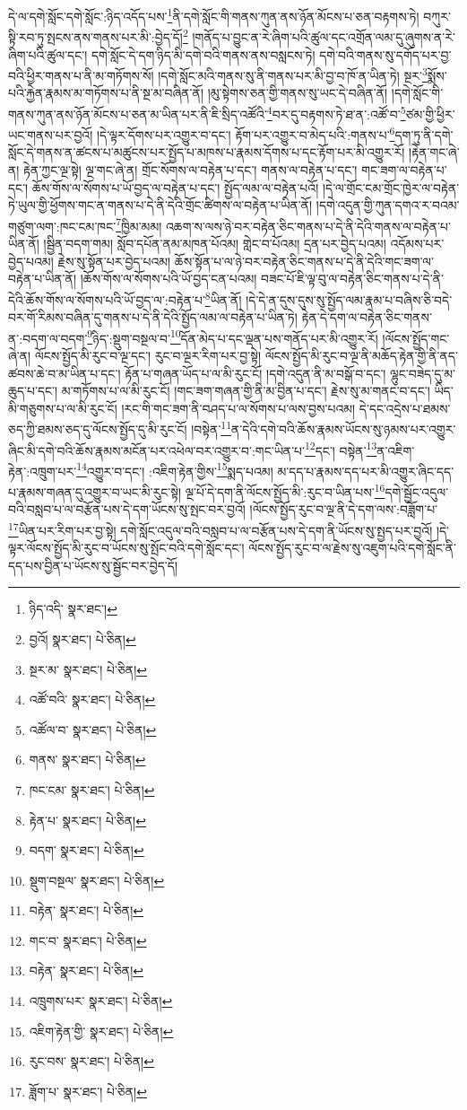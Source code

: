 དེ་ལ་དགེ་སློང་དགེ་སློང་:ཉིད་འདོད་པས་\footnote{ཉིད་འདི་  སྣར་ཐང་། }ནི་དགེ་སློང་གི་གནས་ཀུན་ནས་ཉོན་མོངས་པ་ཅན་བརྟགས་ཏེ། བཀུར་སྟི་རབ་ཏུ་སྤངས་ནས་གནས་པར་མི་:བྱེད་དོ།\footnote{བྱའོ།  སྣར་ཐང་།  པེ་ཅིན། } །གནོད་པ་བྱུང་ན་རེ་ཞིག་པའི་ཚུལ་དང་འགྲོན་ལམ་དུ་ཞུགས་ན་རེ་ཞིག་པའི་ཚུལ་དང་། དགེ་སློང་དེ་དག་ཉིད་མི་དགེ་བའི་གནས་ནས་བསླངས་ཏེ། དགེ་བའི་གནས་སུ་དགོད་པར་བྱ་བའི་ཕྱིར་གནས་པ་ནི་མ་གཏོགས་སོ། །དགེ་སློང་མའི་གནས་སུ་ནི་གནས་པར་མི་བྱ་བ་ཁོ་ན་ཡིན་ཏེ། སྔར་\footnote{སྔར་མ་  སྣར་ཐང་།  པེ་ཅིན། }སྨོས་པའི་རྐྱེན་རྣམས་མ་གཏོགས་པ་ནི་སྔ་མ་བཞིན་ནོ། །མུ་སྟེགས་ཅན་གྱི་གནས་སུ་ཡང་དེ་བཞིན་ནོ། །དགེ་སློང་གི་གནས་ཀུན་ནས་ཉོན་མོངས་པ་ཅན་མ་ཡིན་པར་ནི་ཇི་སྲིད་འཚོའི་\footnote{འཚོ་བའི་  སྣར་ཐང་།  པེ་ཅིན། }བར་དུ་བརྟགས་ཏེ་ཐ་ན་:འཚོ་བ་\footnote{འཚོལ་བ་  སྣར་ཐང་།  པེ་ཅིན། }ཙམ་གྱི་ཕྱིར་ཡང་གནས་པར་བྱའོ། །དེ་ལྟར་དོགས་པར་འགྱུར་བ་དང་། རྟོག་པར་འགྱུར་བ་མེད་པའི་:གནས་པ་\footnote{གནས་  སྣར་ཐང་།  པེ་ཅིན། }དག་ཏུ་ནི་དགེ་སློང་དེ་གནས་ན་ཚངས་པ་མཚུངས་པར་སྤྱོད་པ་མཁས་པ་རྣམས་དོགས་པ་དང་རྟོག་པར་མི་འགྱུར་རོ། །རྟེན་གང་ཞེ་ན། རྟེན་ཀྱང་ལྔ་སྟེ། ལྔ་གང་ཞེ་ན། གྲོང་སོགས་ལ་བརྟེན་པ་དང་། གནས་ལ་བརྟེན་པ་དང་། གང་ཟག་ལ་བརྟེན་པ་དང་། ཆོས་གོས་ལ་སོགས་པ་ཡོ་བྱད་ལ་བརྟེན་པ་དང་། སྤྱོད་ལམ་ལ་བརྟེན་པའོ། །དེ་ལ་གྲོང་ངམ་གྲོང་ཁྱེར་ལ་བརྟེན་ཏེ་ཡུལ་གྱི་ཕྱོགས་གང་ན་གནས་པ་དེ་ནི་དེའི་གྲོང་ཚིགས་ལ་བརྟེན་པ་ཡིན་ནོ། །དགེ་འདུན་གྱི་ཀུན་དགའ་ར་བའམ་གཙུག་ལག་:ཁང་ངམ་ཁང་\footnote{ཁང་ངམ་  སྣར་ཐང་།  པེ་ཅིན། }ཁྱིམ་མམ། འཆག་ས་ལས་ཉེ་བར་བརྟེན་ཅིང་གནས་པ་དེ་ནི་དེའི་གནས་ལ་བརྟེན་པ་ཡིན་ནོ། །སྦྱིན་བདག་གམ། སློབ་དཔོན་ནམ་མཁན་པོའམ། གླེང་བ་པོའམ། དྲན་པར་བྱེད་པའམ། འདོམས་པར་བྱེད་པའམ། རྗེས་སུ་སྟོན་པར་བྱེད་པའམ། ཆོས་སྟོན་པ་ལ་ཉེ་བར་བརྟེན་ཅིང་གནས་པ་དེ་ནི་དེའི་གང་ཟག་ལ་བརྟེན་པ་ཡིན་ནོ། །ཆོས་གོས་ལ་སོགས་པའི་ཡོ་བྱད་ངན་པའམ། བཟང་པོ་ཇི་ལྟ་བུ་ལ་བརྟེན་ཅིང་གནས་པ་དེ་ནི་དེའི་ཆོས་གོས་ལ་སོགས་པའི་ཡོ་བྱད་ལ་:བརྟེན་པ་\footnote{རྟེན་པ་  སྣར་ཐང་།  པེ་ཅིན། }ཡིན་ནོ། །དེ་དེ་ན་དུས་དུས་སུ་སྤྱོད་ལམ་རྣམ་པ་བཞིས་ཅི་བདེ་བར་གོ་རིམས་བཞིན་དུ་གནས་པ་དེ་ནི་དེའི་སྤྱོད་ལམ་ལ་བརྟེན་པ་ཡིན་ཏེ། རྟེན་དེ་དག་ལ་བརྟེན་ཅིང་གནས་ན་:བདག་ལ་བདག་\footnote{བདག་  སྣར་ཐང་།  པེ་ཅིན། }ཉིད་:སྡུག་བསྔལ་བ་\footnote{སྡུག་བསྔལ་  སྣར་ཐང་།  པེ་ཅིན། }དོན་མེད་པ་དང་ལྡན་པས་གནོད་པར་མི་འགྱུར་རོ། །ལོངས་སྤྱོད་གང་ཞེ་ན། ལོངས་སྤྱོད་མི་རུང་བ་ལྔ་དང་། རུང་བ་ལྔར་རིག་པར་བྱ་སྟེ། ལོངས་སྤྱོད་མི་རུང་བ་ལྔ་ནི་མཆོད་རྟེན་གྱི་ནི་ནད་ཚབས་ཆེ་བ་མ་ཡིན་པ་དང་། རྟོན་པ་གཞན་ཡོད་པ་ལ་མི་རུང་ངོ། །དགེ་འདུན་ནི་མ་བསྒོ་བ་དང་། ལྷུང་བཟེད་དུ་མ་ཆུད་པ་དང་། མ་གཏོགས་པ་ལ་མི་རུང་ངོ། །གང་ཟག་གཞན་གྱི་ནི་མ་བྱིན་པ་དང་། རྗེས་སུ་མ་གནང་བ་དང་། ཡིད་མི་གཅུགས་པ་ལ་མི་རུང་ངོ། །རང་གི་གང་ཟག་ནི་བཤད་པ་ལ་སོགས་པ་ལས་བྱས་པའམ། དེ་དང་འདྲེས་པ་ཐམས་ཅད་ཀྱི་ཐམས་ཅད་དུ་ལོངས་སྤྱོད་དུ་མི་རུང་ངོ། །བསྟེན་\footnote{བརྟེན་  སྣར་ཐང་།  པེ་ཅིན། }ན་དེའི་དགེ་བའི་ཆོས་རྣམས་ཡོངས་སུ་ཉམས་པར་འགྱུར་ཞིང་མི་དགེ་བའི་ཆོས་རྣམས་མངོན་པར་འཕེལ་བར་འགྱུར་བ་:གང་ཡིན་པ་\footnote{གང་བ་  སྣར་ཐང་།  པེ་ཅིན། }དང་། བསྟེན་\footnote{བརྟེན་  སྣར་ཐང་།  པེ་ཅིན། }ན་འཇིག་རྟེན་:འཁྲུག་པར་\footnote{འཁྲུགས་པར་  སྣར་ཐང་།  པེ་ཅིན། }འགྱུར་བ་དང་། :འཇིག་རྟེན་གྱིས་\footnote{འཇིག་རྟེན་གྱི་  སྣར་ཐང་།  པེ་ཅིན། }སྨད་པའམ། མ་དད་པ་རྣམས་དད་པར་མི་འགྱུར་ཞིང་དད་པ་རྣམས་གཞན་དུ་འགྱུར་བ་ཡང་མི་རུང་སྟེ། ལྔ་པོ་དེ་དག་ནི་ལོངས་སྤྱོད་མི་:རུང་བ་ཡིན་པས་\footnote{རུང་བས་  སྣར་ཐང་།  པེ་ཅིན། }དགེ་སྦྱོང་འདུལ་བའི་བསླབ་པ་ལ་བརྩོན་པས་དེ་དག་ཡོངས་སུ་སྤང་བར་བྱའོ། །ལོངས་སྤྱོད་རུང་བ་ལྔ་ནི་དེ་དག་ལས་:བཟློག་པ་\footnote{ཟློག་པ་  སྣར་ཐང་།  པེ་ཅིན། }ཡིན་པར་རིག་པར་བྱ་སྟེ། དགེ་སློང་འདུལ་བའི་བསླབ་པ་ལ་བརྩོན་པས་དེ་དག་ནི་ཡོངས་སུ་སྤྱད་པར་བྱའོ། །དེ་ལྟར་ལོངས་སྤྱོད་མི་རུང་བ་ཡོངས་སུ་སྤོང་བའི་དགེ་སློང་དང་། ལོངས་སྤྱོད་རུང་བ་ལ་རྗེས་སུ་འཇུག་པའི་དགེ་སློང་ནི་དད་པས་བྱིན་པ་ཡོངས་སུ་སྦྱོང་བར་བྱེད་དོ། 